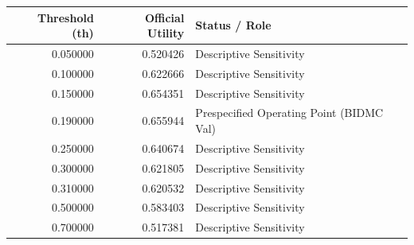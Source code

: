 \begin{tabular}{rrl}
\toprule
Threshold (th) & Official Utility & Status / Role \\
\midrule
0.050000 & 0.520426 & Descriptive Sensitivity \\
0.100000 & 0.622666 & Descriptive Sensitivity \\
0.150000 & 0.654351 & Descriptive Sensitivity \\
0.190000 & 0.655944 & Prespecified Operating Point (BIDMC Val) \\
0.250000 & 0.640674 & Descriptive Sensitivity \\
0.300000 & 0.621805 & Descriptive Sensitivity \\
0.310000 & 0.620532 & Descriptive Sensitivity \\
0.500000 & 0.583403 & Descriptive Sensitivity \\
0.700000 & 0.517381 & Descriptive Sensitivity \\
\bottomrule
\end{tabular}
